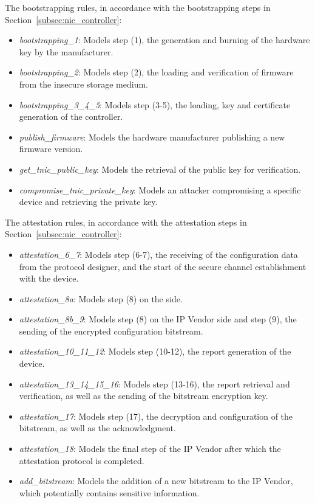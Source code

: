 The bootstrapping rules, in accordance with the bootstrapping steps in Section~\ref{subsec:nic_controller}:
\begin{itemize}

\item \emph{bootstrapping\_1}: Models step (1), the generation and burning of the hardware key by the \projecttitle{} manufacturer.
\item \emph{bootstrapping\_2}: Models step (2), the loading and verification of firmware from the insecure storage medium.
\item \emph{bootstrapping\_3\_4\_5}: Models step (3-5), the loading, key and certificate generation of the controller.
\item \emph{publish\_firmware}: Models the hardware manufacturer publishing a new firmware version.
\item \emph{get\_tnic\_public\_key}: Models the retrieval of the public \projecttitle{} key for verification.
\item \emph{compromise\_tnic\_private\_key}: Models an attacker compromising a specific \projecttitle{} device and retrieving the private key.

\end{itemize}
The attestation rules, in accordance with the attestation steps in Section~\ref{subsec:nic_controller}:
\begin{itemize}

\item \emph{attestation\_6\_7}: Models step (6-7), the receiving of the configuration data from the protocol designer, and the start of the secure channel establishment with the \projecttitle{} device.
\item \emph{attestation\_8a}: Models step (8) on the \projecttitle{} side.
\item \emph{attestation\_8b\_9}: Models step (8) on the IP Vendor side and step (9), the sending of the encrypted configuration bitstream.
\item \emph{attestation\_10\_11\_12}: Models step (10-12), the report generation of the \projecttitle{} device. 
\item \emph{attestation\_13\_14\_15\_16}: Models step (13-16), the report retrieval and verification, as well as the sending of the bitstream encryption key.
\item \emph{attestation\_17}: Models step (17), the decryption and configuration of the bitstream, as well as the acknowledgment.
\item \emph{attestation\_18}: Models the final step of the IP Vendor after which the attestation protocol is completed.
\item \emph{add\_bitstream}: Models the addition of a new bitstream to the IP Vendor, which potentially contains sensitive information.

\end{itemize}
